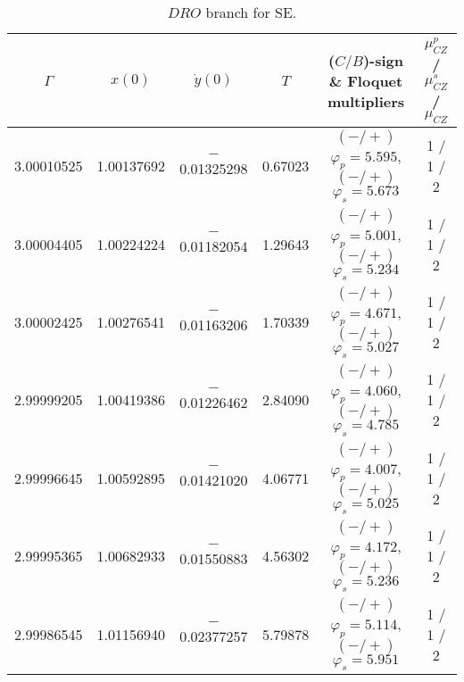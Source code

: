 \documentclass[reqno, 11pt]{amsart}
\theoremstyle{plain}
\theoremstyle{definition}
\theoremstyle{remark}
\begin{document}
\begin{table}[h]\fontsize{10}{10}\selectfont \centering
\caption{$DRO$ branch for SE.}
	\begin{tabular}{c|c|c|c|c|c}
 \hline
		$\Gamma$ & $x(0)$ & $\dot{y}(0)$ & $T$ & ($C/B$)-sign \& Floquet multipliers & $\mu_{CZ}^p$ / $\mu_{CZ}^s$ / $\mu_{CZ}$\\
		\hline 3.00010525 & 1.00137692 & $-$0.01325298 & 0.67023 & $(-/+)$ $\varphi_p = 5.595$, $(-/+)$ $\varphi_s = 5.673$ & 1 / 1 / 2\\
        3.00004405 & 1.00224224 & $-$0.01182054 & 1.29643 & $(-/+)$ $\varphi_p = 5.001$, $(-/+)$ $\varphi_s = 5.234$ & 1 / 1 / 2 \\
        3.00002425 & 1.00276541 & $-$0.01163206 & 1.70339 & $(-/+)$ $\varphi_p = 4.671$, $(-/+)$ $\varphi_s = 5.027$ & 1 / 1 / 2 \\
        2.99999205 & 1.00419386 & $-$0.01226462 & 2.84090 & $(-/+)$ $\varphi_p = 4.060$, $(-/+)$ $\varphi_s = 4.785$ & 1 / 1 / 2 \\
        2.99996645 & 1.00592895 & $-$0.01421020 & 4.06771 & $(-/+)$ $\varphi_p = 4.007$, $(-/+)$ $\varphi_s = 5.025$ & 1 / 1 / 2 \\
        2.99995365 & 1.00682933 & $-$0.01550883 & 4.56302 & $(-/+)$ $\varphi_p = 4.172$, $(-/+)$ $\varphi_s = 5.236$ & 1 / 1 / 2 \\
        2.99986545 & 1.01156940 & $-$0.02377257 & 5.79878 & $(-/+)$ $\varphi_p = 5.114$, $(-/+)$ $\varphi_s = 5.951$ & 1 / 1 / 2
	\end{tabular}
	\label{data_dro_s_e}
\end{table}
\end{document}
